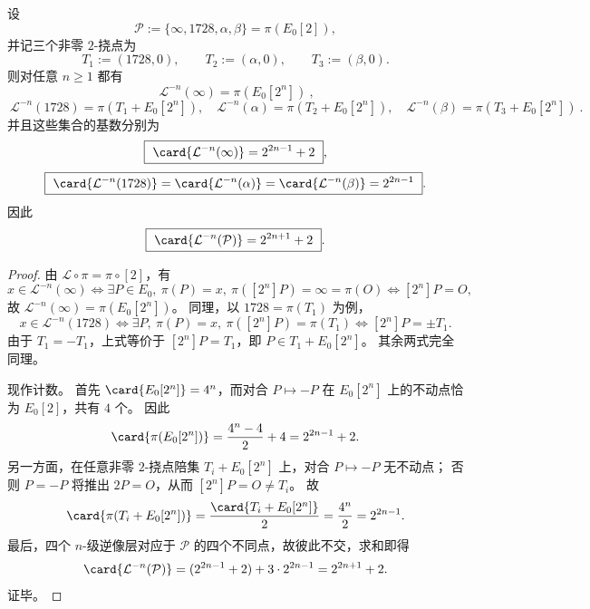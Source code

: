 \begin{theorem}[后临界树的精确层级公式]\label{thm:xi-j-sextic-elliptic-lattes-postcritical-tree-levels}
设
\[
\mathcal P:=\{\infty,1728,\alpha,\beta\}=\pi(E_0[2]),
\]
并记三个非零 \(2\)-挠点为
\[
T_1:=(1728,0),\qquad T_2:=(\alpha,0),\qquad T_3:=(\beta,0).
\]
则对任意 \(n\ge 1\) 都有
\[
\boxed{\ \mathcal L^{-n}(\infty)=\pi(E_0[2^n])\ },
\]
\[
\boxed{\ \mathcal L^{-n}(1728)=\pi(T_1+E_0[2^n]),\quad
\mathcal L^{-n}(\alpha)=\pi(T_2+E_0[2^n]),\quad
\mathcal L^{-n}(\beta)=\pi(T_3+E_0[2^n])\ }.
\]
并且这些集合的基数分别为
\[
\boxed{\ \card{\mathcal L^{-n}(\infty)}=2^{2n-1}+2\ },
\]
\[
\boxed{\ \card{\mathcal L^{-n}(1728)}
=\card{\mathcal L^{-n}(\alpha)}
=\card{\mathcal L^{-n}(\beta)}
=2^{2n-1}\ }.
\]
因此
\[
\boxed{\ \card{\mathcal L^{-n}(\mathcal P)}=2^{2n+1}+2\ }.
\]
\end{theorem}
\begin{proof}
由 \(\mathcal L\circ \pi=\pi\circ [2]\)，有
\[
x\in \mathcal L^{-n}(\infty)
\iff
\exists P\in E_0,\ \pi(P)=x,\ \pi([2^n]P)=\infty=\pi(O)
\iff
[2^n]P=O,
\]
故 \(\mathcal L^{-n}(\infty)=\pi(E_0[2^n])\)。
同理，以 \(1728=\pi(T_1)\) 为例，
\[
x\in \mathcal L^{-n}(1728)
\iff
\exists P,\ \pi(P)=x,\ \pi([2^n]P)=\pi(T_1)
\iff
[2^n]P=\pm T_1.
\]
由于 \(T_1=-T_1\)，上式等价于 \([2^n]P=T_1\)，即 \(P\in T_1+E_0[2^n]\)。
其余两式完全同理。
\par
现作计数。
首先 \(\card{E_0[2^n]}=4^n\)，而对合 \(P\mapsto -P\) 在 \(E_0[2^n]\) 上的不动点恰为 \(E_0[2]\)，共有 \(4\) 个。
因此
\[
\card{\pi(E_0[2^n])}
=\frac{4^n-4}{2}+4
=2^{2n-1}+2.
\]
另一方面，在任意非零 \(2\)-挠点陪集 \(T_i+E_0[2^n]\) 上，对合 \(P\mapsto -P\) 无不动点；
否则 \(P=-P\) 将推出 \(2P=O\)，从而 \([2^n]P=O\neq T_i\)。
故
\[
\card{\pi(T_i+E_0[2^n])}
=\frac{\card{T_i+E_0[2^n]}}{2}
=\frac{4^n}{2}
=2^{2n-1}.
\]
最后，四个 \(n\)-级逆像层对应于 \(\mathcal P\) 的四个不同点，故彼此不交，求和即得
\[
\card{\mathcal L^{-n}(\mathcal P)}
=(2^{2n-1}+2)+3\cdot 2^{2n-1}
=2^{2n+1}+2.
\]
证毕。
\end{proof}

